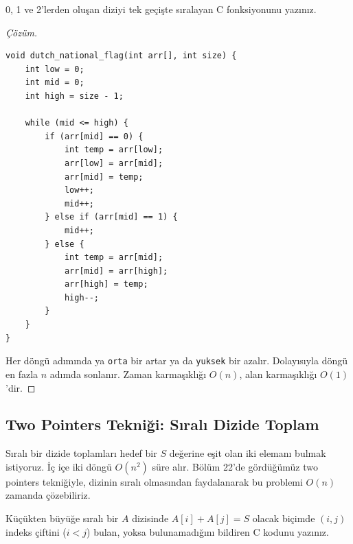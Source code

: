 \begin{example}
0, 1 ve 2'lerden oluşan diziyi tek geçişte sıralayan C fonksiyonunu yazınız.
\end{example}

\begin{proof}[Çözüm]
\begin{lstlisting}[language=CTemel]
void dutch_national_flag(int arr[], int size) {
    int low = 0;
    int mid = 0;
    int high = size - 1;

    while (mid <= high) {
        if (arr[mid] == 0) {
            int temp = arr[low];
            arr[low] = arr[mid];
            arr[mid] = temp;
            low++;
            mid++;
        } else if (arr[mid] == 1) {
            mid++;
        } else {
            int temp = arr[mid];
            arr[mid] = arr[high];
            arr[high] = temp;
            high--;
        }
    }
}\end{lstlisting}

Her döngü adımında ya \texttt{orta} bir artar ya da \texttt{yuksek} bir azalır. Dolayısıyla döngü en fazla $n$ adımda sonlanır. Zaman karmaşıklığı $O(n)$, alan karmaşıklığı $O(1)$'dir.
\end{proof}

\subsection{Two Pointers Tekniği: Sıralı Dizide Toplam}

Sıralı bir dizide toplamları hedef bir $S$ değerine eşit olan iki elemanı bulmak istiyoruz. İç içe iki döngü $O(n^2)$ süre alır. Bölüm 22'de gördüğümüz two pointers tekniğiyle, dizinin sıralı olmasından faydalanarak bu problemi $O(n)$ zamanda çözebiliriz.

\begin{example}
Küçükten büyüğe sıralı bir $A$ dizisinde $A[i] + A[j] = S$ olacak biçimde $(i, j)$ indeks çiftini ($i < j$) bulan, yoksa bulunamadığını bildiren C kodunu yazınız.
\end{example}

